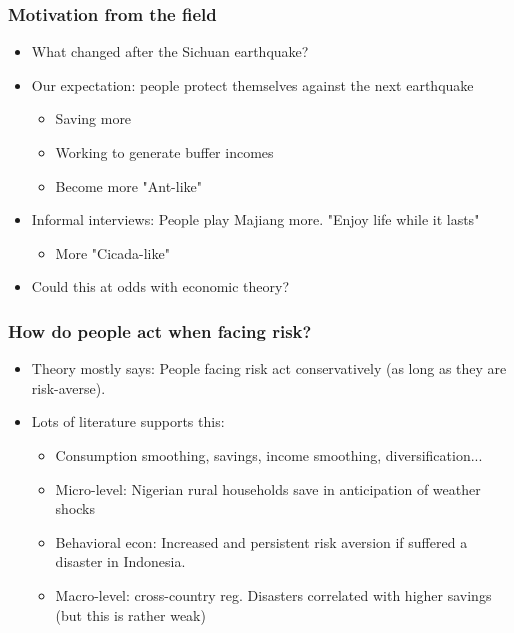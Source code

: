 \documentclass[aspectratio=169]{beamer}
\begin{document}
\begin{frame}
    \frametitle{\LARGE{Motivation from the field}}
    \begin{itemize}
		\item What changed after the Sichuan earthquake? 
		\item Our expectation: people protect themselves against the next earthquake
		\begin{itemize}
		    \item Saving more
		    \item Working to generate buffer incomes
		    \item Become more "Ant-like"
		\end{itemize}
		\item <2-> Informal interviews: 
		    People play Majiang more. "Enjoy life while it lasts"
		\begin{itemize}
		    \item More "Cicada-like"
		\end{itemize}
		\item <3-> Could this at odds with economic theory? 
		
	\end{itemize}  
\end{frame}  

\begin{frame}
    \frametitle{\LARGE{How do people act when facing risk?}}
	\begin{itemize}
		\item Theory mostly says: People facing risk act conservatively (as long as they are risk-averse).
		\item Lots of literature supports this: 
		\begin{itemize}
		    \item Consumption smoothing, savings, income smoothing, diversification...
		    \item Micro-level: \cite{Udry1995}  Nigerian rural households save in anticipation of weather shocks
		    \item Behavioral econ: \cite{Cameron2013} Increased and persistent risk aversion if suffered a disaster in Indonesia. 
		    \item Macro-level: \cite{Skidmore2001} cross-country reg. Disasters correlated with higher savings (but this is rather weak)
		\end{itemize}
	\end{itemize}
\end{frame} 
\end{document}
